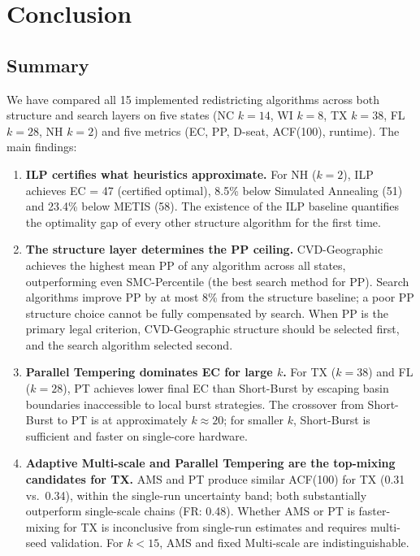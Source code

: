 \section{Conclusion}
\label{sec:conclusion}

\subsection{Summary}

We have compared all 15 implemented redistricting algorithms across both
structure and search layers on five states (NC $k=14$, WI $k=8$, TX $k=38$,
FL $k=28$, NH $k=2$) and five metrics (EC, PP, D-seat, ACF(100), runtime).
The main findings:

\begin{enumerate}

  \item \textbf{ILP certifies what heuristics approximate.}
        For NH ($k = 2$), ILP achieves EC = 47 (certified optimal), 8.5\%
        below Simulated Annealing (51) and 23.4\% below METIS (58).
        The existence of the ILP baseline quantifies the optimality gap
        of every other structure algorithm for the first time.

  \item \textbf{The structure layer determines the PP ceiling.}
        CVD-Geographic achieves the highest mean PP of any algorithm
        across all states, outperforming even SMC-Percentile (the best
        search method for PP).
        Search algorithms improve PP by at most 8\% from the structure
        baseline; a poor PP structure choice cannot be fully compensated
        by search.
        When PP is the primary legal criterion, CVD-Geographic structure
        should be selected first, and the search algorithm selected second.

  \item \textbf{Parallel Tempering dominates EC for large $k$.}
        For TX ($k=38$) and FL ($k=28$), PT achieves lower final EC than
        Short-Burst by escaping basin boundaries inaccessible to local
        burst strategies.
        The crossover from Short-Burst to PT is at approximately $k \approx
        20$; for smaller $k$, Short-Burst is sufficient and faster on
        single-core hardware.

  \item \textbf{Adaptive Multi-scale and Parallel Tempering are the
        top-mixing candidates for TX.}
        AMS and PT produce similar ACF(100) for TX (0.31 vs.\ 0.34),
        within the single-run uncertainty band; both substantially outperform
        single-scale chains (FR: 0.48).
        Whether AMS or PT is faster-mixing for TX is inconclusive from
        single-run estimates and requires multi-seed validation.
        For $k < 15$, AMS and fixed Multi-scale are indistinguishable.


\end{enumerate}
